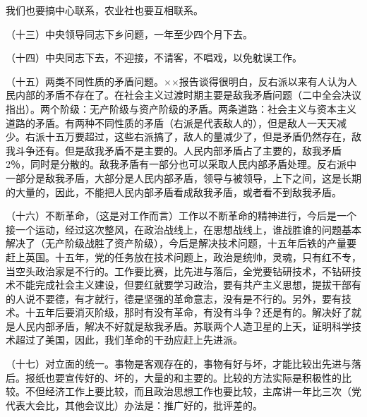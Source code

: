 我们也要搞中心联系，农业社也要互相联系。

（十三）中央领导同志下乡问题，一年至少四个月下去。

（十四）中央同志下去，不迎接，不请客，不唱戏，以免躭误工作。

（十五）两类不同性质的矛盾问题。××报告谈得很明白，反右派以来有人认为人民内部的矛盾不存在了。在社会主义过渡时期主要是敌我矛盾问题（二中全会决议指出）。两个阶级：无产阶级与资产阶级的矛盾。两条道路：社会主义与资本主义道路的矛盾。有两种不同性质的矛盾（右派是代表敌人的），但是敌人一天天减少。右派十五万要超过，这些右派搞了，敌人的量减少了，但是矛盾仍然存在，敌我斗争还有。但是敌我矛盾不是主要的。人民内部矛盾占了主要的，敌我矛盾2％，同时是分散的。敌我矛盾有一部分也可以采取人民内部矛盾处理。反右派中一部分是敌我矛盾，大部分是人民内部矛盾，领导与被领导，上下之间，这是长期的大量的，因此，不能把人民内部矛盾看成敌我矛盾，或者看不到敌我矛盾。

（十六）不断革命，（这是对工作而言）工作以不断革命的精神进行，今后是一个接一个运动，经过这次整风，在政治战线上，在思想战线上，谁战胜谁的问题基本解决了（无产阶级战胜了资产阶级），今后是解决技术问题，十五年后铁的产量要赶上英国。十五年，党的任务放在技术问题上，政治是统帅，灵魂，只有红不专，当空头政治家是不行的。工作要比赛，比先进与落后，全党要钻研技术，不钻研技术不能完成社会主义建设，但要红就要学习政治，要有共产主义思想，提拔干部有的人说不要德，有才就行，德是坚强的革命意志，没有是不行的。另外，要有技术。十五年后要消灭阶级，那时有没有革命，有没有斗争？还是有的。解决好了就是人民内部矛盾，解决不好就是敌我矛盾。苏联两个人造卫星的上天，证明科学技术超过了美国，因此，我们革命的干劲应赶上先进派。

（十七）对立面的统一。事物是客观存在的，事物有好与坏，才能比较出先进与落后。报纸也要宣传好的、坏的，大量的和主要的。比较的方法实际是积极性的比较。不但经济工作上要比较，而且政治思想工作也要比较，主席讲一年比三次（党代表大会比，其他会议比）办法是：推广好的，批评差的。


